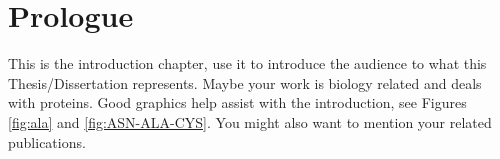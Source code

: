 %
%
%



\pagestyle{plain}
\chapter{Prologue} %
\renewcommand{\thetable}{\arabic{chapter}.\arabic{table}}  
\renewcommand{\thefigure}{\arabic{chapter}.\arabic{figure}} 

This is the introduction chapter, use it to introduce the audience to what this Thesis/Dissertation represents. Maybe your work is biology related and deals with proteins. Good graphics help assist with the introduction, see Figures \ref{fig:ala} and \ref{fig:ASN-ALA-CYS}. You might also want to mention your related publications.

